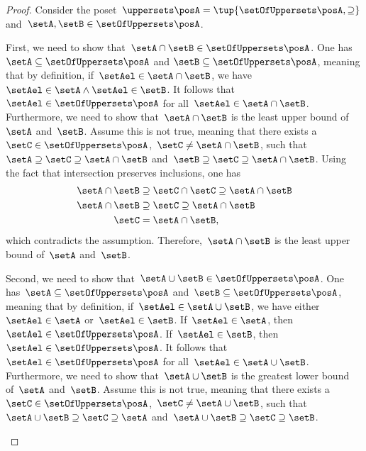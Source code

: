 \begin{proof}
    Consider the poset~$\uppersets \posA=\tup{\setOfUppersets \posA,\supseteq}$ and~$\setA,\setB\in \setOfUppersets \posA$.
    \begin{compactitem}
        \item First, we need to show that~$\setA\cap \setB\in \setOfUppersets \posA$.
        One has~$\setA \subseteq \setOfUppersets \posA$ and $\setB\subseteq \setOfUppersets \posA$, meaning that by definition, if~$\setAel\in \setA\cap \setB$, we have~$\setAel \in \setA \wedge \setAel \in \setB$.
        It follows that~$\setAel \in \setOfUppersets \posA$ for all~$\setAel \in \setA\cap \setB$.
        Furthermore, we need to show that~$\setA\cap \setB$ is the least upper bound of~$\setA$ and~$\setB$.
        Assume this is not true, meaning that there exists a~$\setC\in \setOfUppersets \posA$,~$\setC\neq \setA\cap \setB$, such that~$\setA\supseteq \setC\supseteq \setA\cap \setB$ and~$\setB\supseteq \setC\supseteq \setA\cap \setB$.
        Using the fact that intersection preserves inclusions, one has
        \begin{equation}
            \begin{aligned}
                \setA\cap \setB & \supseteq \setC\cap \setC \supseteq \setA\cap \setB \\
                \setA\cap \setB & \supseteq \setC \supseteq \setA\cap \setB           \\
                \setC           & = \setA\cap \setB,                                  
            \end{aligned}
        \end{equation}
        which contradicts the assumption.
        Therefore,~$\setA\cap \setB$ is the least upper bound of~$\setA$ and~$\setB$.
        \item Second, we need to show that~$\setA\cup \setB\in \setOfUppersets \posA$.
        One has~$\setA\subseteq \setOfUppersets \posA$ and~$\setB\subseteq \setOfUppersets \posA$, meaning that by definition, if~$\setAel\in \setA\cup \setB$, we have either~$\setAel\in \setA$ or~$\setAel\in \setB$.
        If~$\setAel\in \setA$, then~$\setAel\in \setOfUppersets \posA$.
        If~$\setAel\in \setB$, then~$\setAel \in \setOfUppersets \posA$.
        It follows that~$\setAel \in \setOfUppersets \posA$ for all~$\setAel\in \setA\cup \setB$.
        Furthermore, we need to show that~$\setA\cup \setB$ is the greatest lower bound of~$\setA$ and~$\setB$.
        Assume this is not true, meaning that there exists a~$\setC\in \setOfUppersets \posA$,~$\setC\neq \setA\cup \setB$, such that~$\setA\cup \setB\supseteq \setC\supseteq \setA$ and~$\setA\cup \setB\supseteq \setC\supseteq \setB$.

\end{compactitem}
\end{proof}
